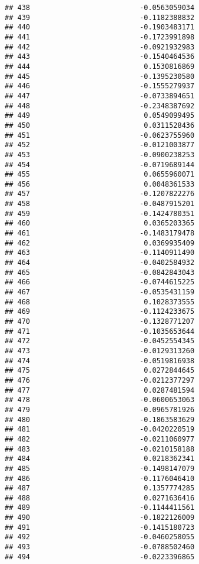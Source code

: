 \documentclass[
]{article}
\begin{document}
\begin{verbatim}
## 438                          -0.0563059034
## 439                          -0.1182388832
## 440                          -0.1903483171
## 441                          -0.1723991898
## 442                          -0.0921932983
## 443                          -0.1540464536
## 444                           0.1530816869
## 445                          -0.1395230580
## 446                          -0.1555279937
## 447                          -0.0733894651
## 448                          -0.2348387692
## 449                           0.0549099495
## 450                           0.0311528436
## 451                          -0.0623755960
## 452                          -0.0121003877
## 453                          -0.0900238253
## 454                          -0.0719689144
## 455                           0.0655960071
## 456                           0.0048361533
## 457                          -0.1207822276
## 458                          -0.0487915201
## 459                          -0.1424780351
## 460                           0.0365203365
## 461                          -0.1483179478
## 462                           0.0369935409
## 463                          -0.1140911490
## 464                          -0.0402584932
## 465                          -0.0842843043
## 466                          -0.0744615225
## 467                          -0.0535431159
## 468                           0.1028373555
## 469                          -0.1124233675
## 470                          -0.1328771207
## 471                          -0.1035653644
## 472                          -0.0452554345
## 473                          -0.0129313260
## 474                          -0.0519816938
## 475                           0.0272844645
## 476                          -0.0212377297
## 477                           0.0287481594
## 478                          -0.0600653063
## 479                          -0.0965781926
## 480                          -0.1863583629
## 481                          -0.0420220519
## 482                          -0.0211060977
## 483                          -0.0210158188
## 484                           0.0218362341
## 485                          -0.1498147079
## 486                          -0.1176046410
## 487                           0.1357774285
## 488                           0.0271636416
## 489                          -0.1144411561
## 490                          -0.1822126009
## 491                          -0.1415180723
## 492                          -0.0460258055
## 493                          -0.0788502460
## 494                          -0.0223396865

\end{verbatim}
\end{document}
